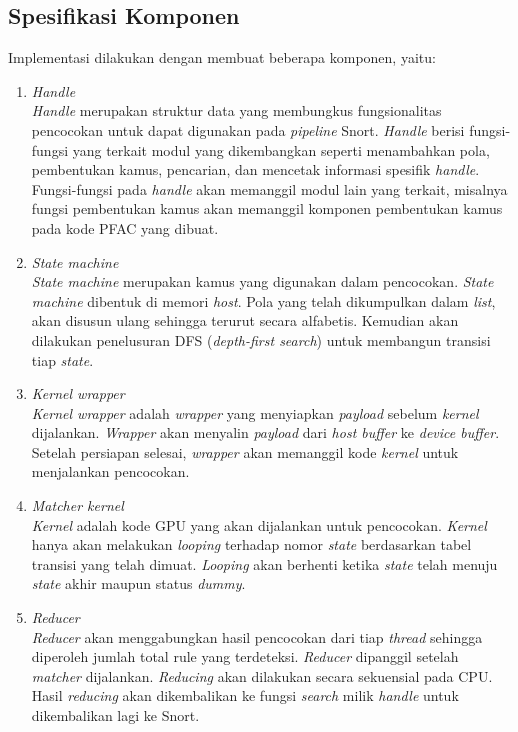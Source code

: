   \subsection{Spesifikasi Komponen}

    Implementasi dilakukan dengan membuat beberapa komponen, yaitu:

    \begin{enumerate}

      \item
      \emph{Handle} \\
      \emph{Handle} merupakan struktur data yang membungkus fungsionalitas pencocokan untuk dapat digunakan pada \emph{pipeline} Snort. \emph{Handle} berisi fungsi-fungsi yang terkait modul yang dikembangkan seperti menambahkan pola, pembentukan kamus, pencarian, dan mencetak informasi spesifik \emph{handle}. Fungsi-fungsi pada \emph{handle} akan memanggil modul lain yang terkait, misalnya fungsi pembentukan kamus akan memanggil komponen pembentukan kamus pada kode PFAC yang dibuat.

      \item
      \emph{State machine} \\
      \emph{State machine} merupakan kamus yang digunakan dalam pencocokan. \emph{State machine} dibentuk di memori \emph{host}. Pola yang telah dikumpulkan dalam \emph{list}, akan disusun ulang sehingga terurut secara alfabetis. Kemudian akan dilakukan penelusuran DFS (\emph{depth-first search}) untuk membangun transisi tiap \emph{state}.

      \item
      \emph{Kernel wrapper} \\
      \emph{Kernel wrapper} adalah \emph{wrapper} yang menyiapkan \emph{payload} sebelum \emph{kernel} dijalankan. \emph{Wrapper} akan menyalin \emph{payload} dari \emph{host buffer} ke \emph{device buffer}. Setelah persiapan selesai, \emph{wrapper} akan memanggil kode \emph{kernel} untuk menjalankan pencocokan.
      
      \item
      \emph{Matcher kernel} \\
      \emph{Kernel} adalah kode GPU yang akan dijalankan untuk pencocokan. \emph{Kernel} hanya akan melakukan \emph{looping} terhadap nomor \emph{state} berdasarkan tabel transisi yang telah dimuat. \emph{Looping} akan berhenti ketika \emph{state} telah menuju \emph{state} akhir maupun status \emph{dummy}.

      \item
      \emph{Reducer} \\
      \emph{Reducer} akan menggabungkan hasil pencocokan dari tiap \emph{thread} sehingga diperoleh jumlah total rule yang terdeteksi. \emph{Reducer} dipanggil setelah \emph{matcher} dijalankan. \emph{Reducing} akan dilakukan secara sekuensial pada CPU. Hasil \emph{reducing} akan dikembalikan ke fungsi \emph{search} milik \emph{handle} untuk dikembalikan lagi ke Snort.
      
    \end{enumerate}

